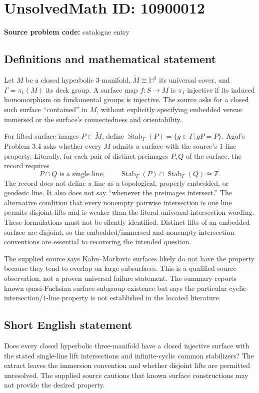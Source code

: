 \documentclass[11pt]{article}
\newcommand{\Z}{\mathbb{Z}}
\begin{document}
\section*{UnsolvedMath ID: 10900012}
\textbf{Source problem code:} catalogue entry
\subsection{Definitions and mathematical statement}
Let \(M\) be a closed hyperbolic \(3\)-manifold, \(\widetilde M\cong\mathbb H^3\) its universal cover, and \(\Gamma=\pi_1(M)\) its deck group. A surface map \(f:S\to M\) is \(\pi_1\)-injective if its induced homomorphism on fundamental groups is injective. The source asks for a closed such surface ``contained'' in \(M\), without explicitly specifying embedded versus immersed or the surface's connectedness and orientability.

For lifted surface images \(P\subset\widetilde M\), define \(\operatorname{Stab}_\Gamma(P)=\{g\in\Gamma:gP=P\}\). Agol's Problem 3.4 asks whether every \(M\) admits a surface with the source's \(1\)-line property. Literally, for each pair of distinct preimages \(P,Q\) of the surface, the record requires
\[
 P\cap Q\text{ is a single line},\qquad
 \operatorname{Stab}_\Gamma(P)\cap\operatorname{Stab}_\Gamma(Q)\cong\Z.
\]
The record does not define a line as a topological, properly embedded, or geodesic line. It also does not say ``whenever the preimages intersect.'' The alternative condition that every nonempty pairwise intersection is one line permits disjoint lifts and is weaker than the literal universal-intersection wording. These formulations must not be silently identified. Distinct lifts of an embedded surface are disjoint, so the embedded/immersed and nonempty-intersection conventions are essential to recovering the intended question.

The supplied source says Kahn--Markovic surfaces likely do not have the property because they tend to overlap on large subsurfaces. This is a qualified source observation, not a proven universal failure statement. The summary reports known quasi-Fuchsian surface-subgroup existence but says the particular cyclic-intersection/\(1\)-line property is not established in the located literature.
\subsection{Short English statement}
Does every closed hyperbolic three-manifold have a closed injective surface with the stated single-line lift intersections and infinite-cyclic common stabilizers? The extract leaves the immersion convention and whether disjoint lifts are permitted unresolved. The supplied source cautions that known surface constructions may not provide the desired property.
\end{document}
